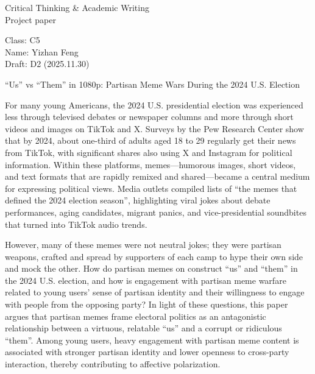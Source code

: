 \documentclass[12pt,twoside]{article}
\begin{document}
{\fontsize{16}{35}\selectfont
Critical Thinking \& Academic Writing\\
Project paper\par
}

\vspace{-0.5\baselineskip}

Class: C5 \\
Name: Yizhan Feng \\
Draft: D2 (2025.11.30) \\

\vspace{-0.75\baselineskip}

\begin{center}
{\fontsize{14}{17}\selectfont
``Us'' vs ``Them'' in 1080p: Partisan Meme Wars During the 2024 U.S. Election\par
}
\end{center}

\vspace{-\baselineskip}


For many young Americans, the 2024 U.S. presidential election was experienced less through televised debates or newspaper columns and more through short videos and images on TikTok and X. Surveys by the Pew Research Center show that by 2024, about one-third of adults aged 18 to 29 regularly get their news from TikTok, with significant shares also using X and Instagram for political information. \parencite{shearer2024newsTikTokXFacebookInstagram} Within these platforms, memes---humorous images, short videos, and text formats that are rapidly remixed and shared---became a central medium for expressing political views. Media outlets compiled lists of ``the memes that defined the 2024 election season'', highlighting viral jokes about debate performances, aging candidates, migrant panics, and vice-presidential soundbites that turned into TikTok audio trends. 

However, many of these memes were not neutral jokes; they were partisan weapons, crafted and spread by supporters of each camp to hype their own side and mock the other. How do partisan memes on  construct ``us'' and ``them'' in the 2024 U.S. election, and how is engagement with partisan meme warfare related to young users' sense of partisan identity and their willingness to engage with people from the opposing party? In light of these questions, this paper argues that partisan memes frame electoral politics as an antagonistic relationship between a virtuous, relatable ``us'' and a corrupt or ridiculous “them”. Among young users, heavy engagement with partisan meme content is associated with stronger partisan identity and lower openness to cross-party interaction, thereby contributing to affective polarization. 
\end{document}
